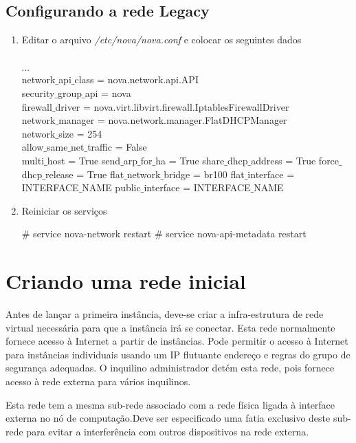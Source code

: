 \subsection{Configurando a rede Legacy}
\begin{enumerate}
	\item Editar o arquivo \emph{/etc/nova/nova.conf} e colocar os seguintes dados
	\begin{snugshade}
		[DEFAULT]\\
		$\cdots$\\
		network$\_$api$\_$class = nova.network.api.API\\
		security$\_$group$\_$api = nova \\
		firewall$\_$driver = nova.virt.libvirt.firewall.IptablesFirewallDriver\\
		network$\_$manager = nova.network.manager.FlatDHCPManager\\
		network$\_$size = 254\\
		allow$\_$same$\_$net$\_$traffic = False\\
		multi$\_$host = True
		send$\_$arp$\_$for$\_$ha = True
		share$\_$dhcp$\_$address = True
		force$\_$dhcp$\_$release = True
		flat$\_$network$\_$bridge = br100
		flat$\_$interface = INTERFACE$\_$NAME
		public$\_$interface = INTERFACE$\_$NAME
	\end{snugshade}
	
	\item Reiniciar os serviços
	\begin{snugshade}
		\# service nova-network restart
		\# service nova-api-metadata restart
	\end{snugshade}
\end{enumerate}

\section{Criando uma rede inicial}
Antes de lançar a primeira instância, deve-se criar a infra-estrutura de rede virtual necessária para que a instância irá se conectar. Esta rede normalmente fornece acesso à Internet a partir de instâncias. Pode permitir o acesso à Internet para instâncias individuais usando um IP flutuante endereço e regras do grupo de segurança adequadas. O inquilino administrador detém esta rede, pois fornece acesso à rede externa para vários inquilinos.


Esta rede tem a mesma sub-rede associado com a rede física ligada à interface externa no nó de computação.Deve ser especificado uma fatia exclusivo deste sub-rede para evitar a interferência com outros dispositivos na rede externa.

